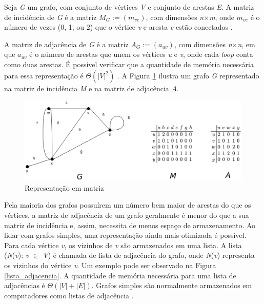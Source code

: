 Seja \textit{G} um grafo, com conjunto de vértices \textit{V} e conjunto de arestas \textit{E}. A matriz de incidência de \textit{G} é a matriz $M_G:= (m_{ve})$, com dimensões \textit{n$\times$m}, onde $m_{ve}$ é o número de vezes (0, 1, ou 2) que o vértice \textit{v} e aresta \textit{e} estão conectados \cite{Bondy:2007}.

A matriz de adjacência de \textit{G} é a matriz $A_G := (a_{uv})$, com dimensões \textit{n$\times$n}, em que $a_{uv}$ é o número de arestas que unem os vértices \textit{u} e \textit{v}, onde cada \textit{loop} conta como duas arestas. É possível verificar que a quantidade de memória necessária para essa representação é $\Theta(|\textit{V}|^2)$ \cite{Bondy:2007}. A Figura \ref{matriz} ilustra um grafo \textit{G} representado na matriz de incidência \textit{M} e na matriz de adjacência \textit{A}.

\newpage

\begin{figure}[!h]
	\centering
	\includegraphics[scale=0.6]{figuras/capitulo2/matriz.eps}
	\caption{Representação em matriz}
	\label{matriz}
\end{figure}

Pela maioria dos grafos possuírem um número bem maior de arestas do que os vértices, a matriz de adjacência de um grafo geralmente é menor do que a sua matriz de incidência e, assim, necessita de menos espaço de armazenamento. Ao lidar com grafos simples, uma representação ainda mais otimizada é possível. Para cada vértice \textit{v}, os vizinhos de \textit{v} são armazenados em uma lista. A lista (\textit{N}(\textit{v}): \textit{v $\in$ V}) é chamada de lista de adjacência do grafo, onde \textit{N}(\textit{v}) representa os vizinhos do vértice \textit{v}. Um exemplo pode ser observado na Figura \ref{lista_adjacencia}. A quantidade de memória necessária para uma lista de adjacências é $\Theta(|\textit{V}| + |\textit{E}|)$. Grafos simples são normalmente armazenados em computadores como listas de adjacência \cite{Costa:2011}.

